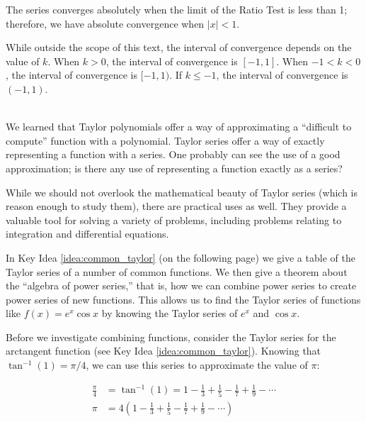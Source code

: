 {The series converges absolutely when the limit of the Ratio Test is less than 1; therefore, we have absolute convergence when $|x|<1$. 

While outside the scope of this text, the interval of convergence depends on the value of $k$. When $k>0$, the interval of convergence is $[-1,1]$. When $-1<k<0$, the interval of convergence is $[-1,1)$. If $k\leq -1$, the interval of convergence is $(-1,1)$.
}\\

We learned that Taylor polynomials offer a way of approximating a ``difficult to compute'' function with a polynomial. Taylor series offer a way of exactly representing a function with a series. One probably can see the use of a good approximation; is there any use of representing a function exactly as a series? 

While we should not overlook the mathematical beauty of Taylor series (which is reason enough to study them), there are practical uses as well. They provide a valuable tool for solving a variety of problems, including problems relating to integration and differential equations. 

In Key Idea \ref{idea:common_taylor} (on the following page) we give  a table of the Taylor series of a number of common functions. We then give a theorem about the ``algebra of power series,'' that is, how we can combine power series to create power series of new functions. This allows us to find the Taylor series of functions like $f(x) = e^x\cos x$ by knowing the Taylor series of $e^x$ and $\cos x$.

Before we investigate combining functions, consider the Taylor series for the arctangent function (see Key Idea \ref{idea:common_taylor}). Knowing that $\tan^{-1}(1) = \pi/4$, we can use this series to approximate the value of $\pi$:

\begin{align*}
\frac{\pi}4 &= \tan^{-1}(1) = 1-\frac13+\frac15-\frac17+\frac19-\cdots\\
\pi &= 4\left(1-\frac13+\frac15-\frac17+\frac19-\cdots\right)
\end{align*} 


